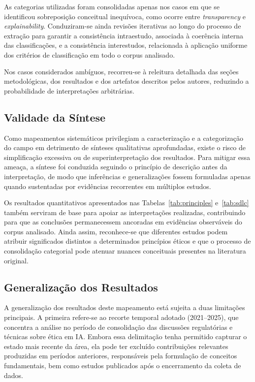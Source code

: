As categorias utilizadas foram consolidadas apenas nos casos em que se identificou sobreposição conceitual inequívoca, como ocorre entre \textit{transparency} e \textit{explainability}. Conduziram-se ainda revisões iterativas ao longo do processo de extração para garantir a consistência intraestudo, associada à coerência interna das classificações, e a consistência interestudos, relacionada à aplicação uniforme dos critérios de classificação em todo o corpus analisado.

Nos casos considerados ambíguos, recorreu-se à releitura detalhada das seções metodológicas, dos resultados e dos artefatos descritos pelos autores, reduzindo a probabilidade de interpretações arbitrárias.

\subsection{Validade da Síntese}

Como mapeamentos sistemáticos privilegiam a caracterização e a categorização do campo em detrimento de sínteses qualitativas aprofundadas, existe o risco de simplificação excessiva ou de superinterpretação dos resultados. Para mitigar essa ameaça, a síntese foi conduzida seguindo o princípio de descrição antes da interpretação, de modo que inferências e generalizações fossem formuladas apenas quando sustentadas por evidências recorrentes em múltiplos estudos.

Os resultados quantitativos apresentados nas Tabelas~\ref{tab:principles} e~\ref{tab:sdlc} também serviram de base para apoiar as interpretações realizadas, contribuindo para que as conclusões permanecessem ancoradas em evidências observáveis do corpus analisado. Ainda assim, reconhece-se que diferentes estudos podem atribuir significados distintos a determinados princípios éticos e que o processo de consolidação categorial pode atenuar nuances conceituais presentes na literatura original.

\subsection{Generalização dos Resultados}

A generalização dos resultados deste mapeamento está sujeita a duas limitações principais. A primeira refere-se ao recorte temporal adotado (2021--2025), que concentra a análise no período de consolidação das discussões regulatórias e técnicas sobre ética em IA. Embora essa delimitação tenha permitido capturar o estado mais recente da área, ela pode ter excluído contribuições relevantes produzidas em períodos anteriores, responsáveis pela formulação de conceitos fundamentais, bem como estudos publicados após o encerramento da coleta de dados.

